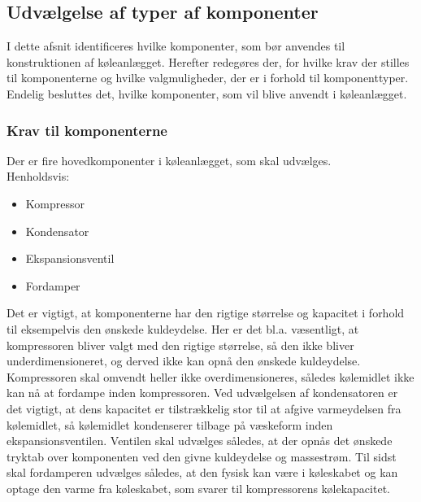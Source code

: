 \documentclass[../Hovedrapport.tex]{subfiles}
\begin{document}
\subsection{Udvælgelse af typer af komponenter}
I dette afsnit identificeres hvilke komponenter, som bør anvendes til konstruktionen af køleanlægget. Herefter redegøres der, for hvilke krav der stilles til komponenterne og hvilke valgmuligheder, der er i forhold til komponenttyper. Endelig besluttes det, hvilke komponenter, som vil blive anvendt i køleanlægget.
\subsubsection*{Krav til komponenterne}
\label{sec:udv_komponenter}
Der er fire hovedkomponenter i køleanlægget, som skal udvælges. \\ 
Henholdsvis:
\begin{itemize}
    \item Kompressor
    \item Kondensator
    \item Ekspansionsventil
    \item Fordamper
\end{itemize}
Det er vigtigt, at komponenterne har den rigtige størrelse og kapacitet i forhold til eksempelvis den ønskede kuldeydelse. Her er det bl.a. væsentligt, at kompressoren bliver valgt med den rigtige størrelse, så den ikke bliver underdimensioneret, og derved ikke kan opnå den ønskede kuldeydelse. Kompressoren skal omvendt heller ikke overdimensioneres, således kølemidlet ikke kan nå at fordampe inden kompressoren. Ved udvælgelsen af kondensatoren er det vigtigt, at dens kapacitet er tilstrækkelig stor til at afgive varmeydelsen fra kølemidlet, så kølemidlet kondenserer tilbage på væskeform inden ekspansionsventilen. Ventilen skal udvælges således, at der opnås det ønskede tryktab over komponenten ved den givne kuldeydelse og massestrøm. Til sidst skal fordamperen udvælges således, at den fysisk kan være i køleskabet og kan optage den varme fra køleskabet, som svarer til kompressorens kølekapacitet.
\end{document}
